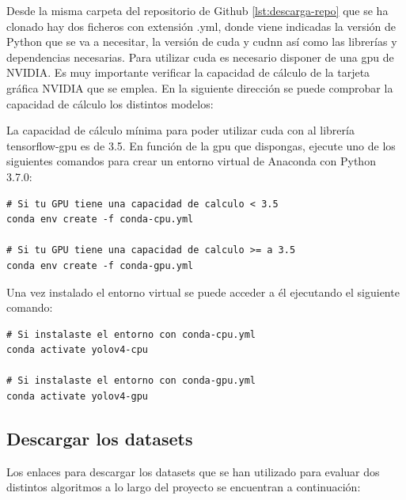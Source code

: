 Desde la misma carpeta del repositorio de Github \ref{lst:descarga-repo} que se ha clonado hay dos ficheros con extensión .yml, donde viene indicadas la versión de Python que se va a necesitar, la versión de \gls{cuda} y \gls{cudnn} así como las librerías y dependencias necesarias. Para utilizar \gls{cuda} es necesario disponer de una \gls{gpu} de NVIDIA. Es muy importante verificar la capacidad de cálculo de la tarjeta gráfica NVIDIA que se emplea. En la siguiente dirección \cite{cuda-gpus} se puede comprobar la capacidad de cálculo los distintos modelos:

La capacidad de cálculo mínima para poder utilizar \gls{cuda} con al librería tensorflow-gpu es de 3.5. En función de la \gls{gpu} que dispongas, ejecute uno de los siguientes comandos para crear un entorno virtual de Anaconda con Python 3.7.0:

\vspace{0.5cm}

\begin{lstlisting}[language=iPython,caption=Creación entorno virtual en Anaconda,captionpos=b,label={lst:crear-env}]
# Si tu GPU tiene una capacidad de calculo < 3.5
conda env create -f conda-cpu.yml

# Si tu GPU tiene una capacidad de calculo >= a 3.5
conda env create -f conda-gpu.yml
\end{lstlisting}

Una vez instalado el entorno virtual se puede acceder a él ejecutando el siguiente comando:

\vspace{0.5cm}

\begin{lstlisting}[language=iPython,caption=Activar entorno virtual de Anaconda,captionpos=b,label={lst:activar-env}]
# Si instalaste el entorno con conda-cpu.yml
conda activate yolov4-cpu

# Si instalaste el entorno con conda-gpu.yml
conda activate yolov4-gpu
\end{lstlisting}

\subsection{Descargar los datasets}
\label{subsec:descarga-datasets}

Los enlaces para descargar los datasets que se han utilizado para evaluar dos distintos algoritmos a lo largo del proyecto se encuentran a continuación:

